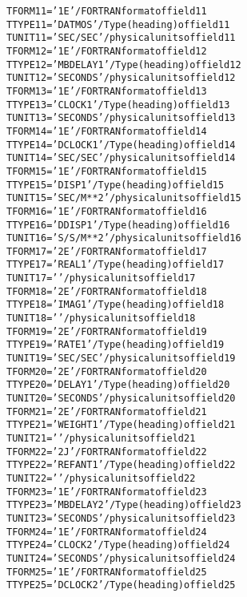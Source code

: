 \documentclass[twoside]{article}
\begin{document}
\begin{alltt}
TFORM11 = '1E      '           / FORTRAN format of field 11
TTYPE11 = 'DATMOS          '   / Type (heading) of field 11
TUNIT11 = 'SEC/SEC '           / physical units of field 11
TFORM12 = '1E      '           / FORTRAN format of field 12
TTYPE12 = 'MBDELAY1        '   / Type (heading) of field 12
TUNIT12 = 'SECONDS '           / physical units of field 12
TFORM13 = '1E      '           / FORTRAN format of field 13
TTYPE13 = 'CLOCK 1         '   / Type (heading) of field 13
TUNIT13 = 'SECONDS '           / physical units of field 13
TFORM14 = '1E      '           / FORTRAN format of field 14
TTYPE14 = 'DCLOCK 1        '   / Type (heading) of field 14
TUNIT14 = 'SEC/SEC '           / physical units of field 14
TFORM15 = '1E      '           / FORTRAN format of field 15
TTYPE15 = 'DISP 1          '   / Type (heading) of field 15
TUNIT15 = 'SEC/M**2'           / physical units of field 15
TFORM16 = '1E      '           / FORTRAN format of field 16
TTYPE16 = 'DDISP 1         '   / Type (heading) of field 16
TUNIT16 = 'S/S/M**2'           / physical units of field 16
TFORM17 = '2E      '           / FORTRAN format of field 17
TTYPE17 = 'REAL1           '   / Type (heading) of field 17
TUNIT17 = '        '           / physical units of field 17
TFORM18 = '2E      '           / FORTRAN format of field 18
TTYPE18 = 'IMAG1           '   / Type (heading) of field 18
TUNIT18 = '        '           / physical units of field 18
TFORM19 = '2E      '           / FORTRAN format of field 19
TTYPE19 = 'RATE 1          '   / Type (heading) of field 19
TUNIT19 = 'SEC/SEC '           / physical units of field 19
TFORM20 = '2E      '           / FORTRAN format of field 20
TTYPE20 = 'DELAY 1         '   / Type (heading) of field 20
TUNIT20 = 'SECONDS '           / physical units of field 20
TFORM21 = '2E      '           / FORTRAN format of field 21
TTYPE21 = 'WEIGHT 1        '   / Type (heading) of field 21
TUNIT21 = '        '           / physical units of field 21
TFORM22 = '2J      '           / FORTRAN format of field 22
TTYPE22 = 'REFANT 1        '   / Type (heading) of field 22
TUNIT22 = '        '           / physical units of field 22
TFORM23 = '1E      '           / FORTRAN format of field 23
TTYPE23 = 'MBDELAY2        '   / Type (heading) of field 23
TUNIT23 = 'SECONDS '           / physical units of field 23
TFORM24 = '1E      '           / FORTRAN format of field 24
TTYPE24 = 'CLOCK 2         '   / Type (heading) of field 24
TUNIT24 = 'SECONDS '           / physical units of field 24
TFORM25 = '1E      '           / FORTRAN format of field 25
TTYPE25 = 'DCLOCK 2        '   / Type (heading) of field 25

\end{alltt}
\end{document}
